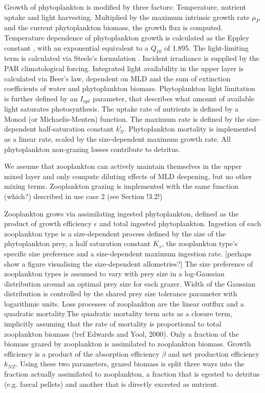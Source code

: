 \documentclass[journal abbreviations, manuscript]{copernicus}
\begin{document}
Growth of phytoplankton is modified by three factors: Temperature, nutrient uptake and light harvesting. Multiplied by the maximum intrinsic growth rate $\mu_P$ and the current phytoplankton biomass, the growth flux is computed. Temperature dependence of phytoplankton growth is calculated as the Eppley constant \citep{Eppley1972TemperatureSea}, with an exponential equivalent to a $Q_{10}$ of 1.895.
The light-limiting term is calculated via Steele's formulation \citep{Steele1962EnvironmentalSea}. Incident irradiance is supplied by the PAR climatological forcing. Integrated light availability in the upper layer is calculated via Beer's law, dependent on MLD and the sum of extinction coefficients of water and phytoplankton biomass. Phytoplankton light limitation is further defined by an $I_{opt}$ parameter, that describes what amount of available light saturates photosynthesis.
The uptake rate of nutrients is defined by a Monod (or Michaelis-Menten) function. The maximum rate is defined by the size-dependent half-saturation constant $k^i_N$. 
Phytoplankton mortality is implemented as a linear rate, scaled by the size-dependent maximum growth rate. 
All phytoplankton non-grazing losses contribute to detritus.

We assume that zooplankton can actively maintain themselves in the upper mixed layer and only compute diluting effects of MLD deepening, but no other mixing terms.
Zooplankton grazing is implemented with the same function (which?) described in use case 2 (see Section !3.2!) 

Zooplankton grows via assimilating ingested phytoplankton, defined as the product of growth efficiency $\epsilon$ and total ingested phytoplankton. Ingestion of each zooplankton type is a size-dependent process defined by the size of the phytoplankton prey, a half saturation constant $K_s$, the zooplankton type's specific size preference and a size-dependent maximum ingestion rate. [perhaps show a figure visualising the size-dependent allometries?]
The size preference of zooplankton types is assumed to vary with prey size in a log-Gaussian distribution around an optimal prey size for each grazer.
Width of the Gaussian distribution is controlled by the shared prey size tolerance parameter with logarithmic units.
Loss processes of zooplankton are the linear outflux and a quadratic mortality.The quadratic mortality term acts as a closure term, implicitly assuming that the rate of mortality is proportional to total zooplankton biomass (!ref Edwards and Yool, 2000). 
Only a fraction of the biomass grazed by zooplankton is assimilated to zooplankton biomass. Growth efficiency is a product of the absorption efficiency $\beta$ and net production efficiency $k_{NZ}$. Using these two parameters, grazed biomass is split three ways into the fraction actually assimilated to zooplankton, a fraction that is egested to detritus (e.g. faecal pellets) and another that is directly excreted as nutrient. 
\end{document}
